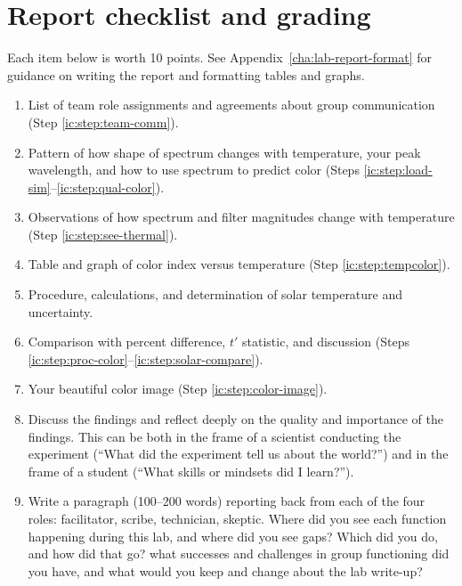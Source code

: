 \section{Report checklist and grading}

Each item below is worth 10 points. See Appendix\ \ref{cha:lab-report-format} for guidance on writing the report and formatting tables and graphs.

\begin{enumerate}

	\item List of team role assignments and agreements about group communication (Step \ref{ic:step:team-comm}).

	\item Pattern of how shape of spectrum changes with temperature, your peak wavelength, and how to use spectrum to predict color (Steps \ref{ic:step:load-sim}--\ref{ic:step:qual-color}).
	
	\item Observations of how spectrum and filter magnitudes change with temperature (Step \ref{ic:step:see-thermal}).
	
	\item Table and graph of color index versus temperature (Step \ref{ic:step:tempcolor}).
	
	\item Procedure, calculations, and determination of solar temperature and uncertainty.
	
	\item Comparison with percent difference, $t'$ statistic, and discussion (Steps \ref{ic:step:proc-color}--\ref{ic:step:solar-compare}).
	
	\item Your beautiful color image (Step \ref{ic:step:color-image}).
	
	\item Discuss the findings and reflect deeply on the quality and importance of the findings. This can
	be both in the frame of a scientist conducting the experiment (“What did the experiment tell us
	about the world?”) and in the frame of a student (“What skills or mindsets did I learn?”).
	
	
	\item Write a paragraph (100--200 words) reporting back from each of the four roles: facilitator, scribe, technician,
	skeptic. Where did you see each function happening during this lab, and where did you see gaps? Which did you do, and how did that go? what successes and	challenges in group functioning did you have, and what would you keep and change about the
	lab write-up?
\end{enumerate}
